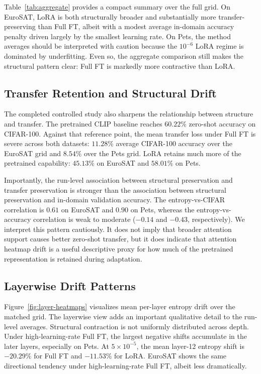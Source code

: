 \documentclass[10pt]{article}
\begin{document}
Table~\ref{tab:aggregate} provides a compact summary over the full grid. On EuroSAT, LoRA is both structurally broader and substantially more transfer-preserving than Full FT, albeit with a modest average in-domain accuracy penalty driven largely by the smallest learning rate. On Pets, the method averages should be interpreted with caution because the $10^{-6}$ LoRA regime is dominated by underfitting. Even so, the aggregate comparison still makes the structural pattern clear: Full FT is markedly more contractive than LoRA.

\subsection{Transfer Retention and Structural Drift}
The completed controlled study also sharpens the relationship between structure and transfer. The pretrained CLIP baseline reaches $60.22\%$ zero-shot accuracy on CIFAR-100. Against that reference point, the mean transfer loss under Full FT is severe across both datasets: $11.28\%$ average CIFAR-100 accuracy over the EuroSAT grid and $8.54\%$ over the Pets grid. LoRA retains much more of the pretrained capability: $45.13\%$ on EuroSAT and $58.01\%$ on Pets.

Importantly, the run-level association between structural preservation and transfer preservation is stronger than the association between structural preservation and in-domain validation accuracy. The entropy-vs-CIFAR correlation is $0.61$ on EuroSAT and $0.90$ on Pets, whereas the entropy-vs-accuracy correlation is weak to moderate ($-0.14$ and $-0.43$, respectively). We interpret this pattern cautiously. It does not imply that broader attention support causes better zero-shot transfer, but it does indicate that attention heatmap drift is a useful descriptive proxy for how much of the pretrained representation is retained during adaptation.

\subsection{Layerwise Drift Patterns}
Figure~\ref{fig:layer-heatmaps} visualizes mean per-layer entropy drift over the matched grid. The layerwise view adds an important qualitative detail to the run-level averages. Structural contraction is not uniformly distributed across depth. Under high-learning-rate Full FT, the largest negative shifts accumulate in the later layers, especially on Pets. At $5{\times}10^{-5}$, the mean layer-12 entropy shift is $-20.29\%$ for Full FT and $-11.53\%$ for LoRA. EuroSAT shows the same directional tendency under high-learning-rate Full FT, albeit less dramatically.
\end{document}
